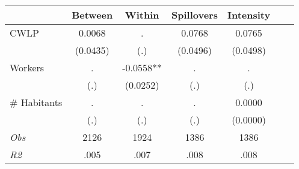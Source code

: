 \begin{tabular}{l*{6}{c}}\hline&\multicolumn{1}{c}{Between}&\multicolumn{1}{c}{Within}&\multicolumn{1}{c}{Spillovers}&\multicolumn{1}{c}{Intensity}\\ \hline 
CWLP & 0.0068 & . & 0.0768 & 0.0765 \\
 & (0.0435) & (.) & (0.0496) & (0.0498) \\
Workers & . & -0.0558** & . & . \\
 & (.) & (0.0252) & (.) & (.) \\
\# Habitants & . & . & . & 0.0000 \\
  & (.) & (.) & (.) & (0.0000) \\
\hline \textit{Obs} & 2126 & 1924 & 1386 & 1386  \\ \textit{R2} & .005 & .007 & .008 & .008 \\ \hline \end{tabular}
